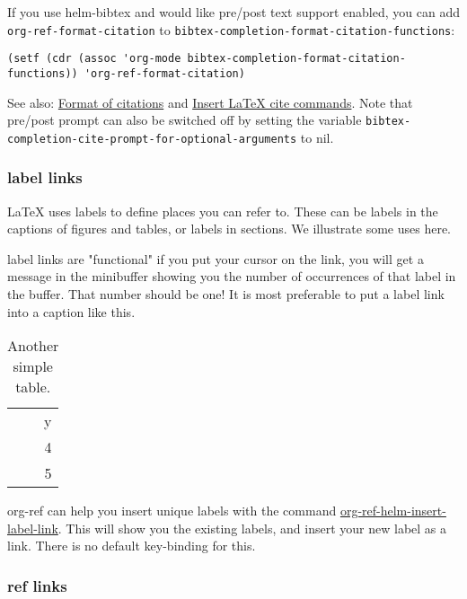\documentclass[11pt]{article}
\begin{document}
If you use helm-bibtex and would like pre/post text support enabled, you can add \texttt{org-ref-format-citation} to \texttt{bibtex-completion-format-citation-functions}:

\begin{verbatim}
(setf (cdr (assoc 'org-mode bibtex-completion-format-citation-functions)) 'org-ref-format-citation)
\end{verbatim}

See also: \href{https://github.com/tmalsburg/helm-bibtex\#format-of-citations}{Format of citations} and \href{https://github.com/tmalsburg/helm-bibtex\#latex-citation-commands}{Insert \LaTeX{} cite commands}. Note that pre/post prompt can also be switched off by setting the variable \texttt{bibtex-completion-cite-prompt-for-optional-arguments} to nil.

\subsubsection{label links}
\label{sec:orge07bf9a}

\LaTeX{} uses labels to define places you can refer to. These can be labels in the captions of figures and tables, or labels in sections. We illustrate some uses here.

label links are "functional" if you put your cursor on the link, you will get a message in the minibuffer showing you the number of occurrences of that label in the buffer. That number should be one! It is most preferable to put a label link into a caption like this.

\begin{table}[htbp]
\caption{Another simple table. \label{tab-ydata}}
\centering
\begin{tabular}{r}
y\\
4\\
5\\
\end{tabular}
\end{table}

org-ref can help you insert unique labels with the command \url{org-ref-helm-insert-label-link}. This will show you the existing labels, and insert your new label as a link. There is no default key-binding for this.

\subsubsection{ref links}
\label{sec:org1c5e0c7}
\end{document}
